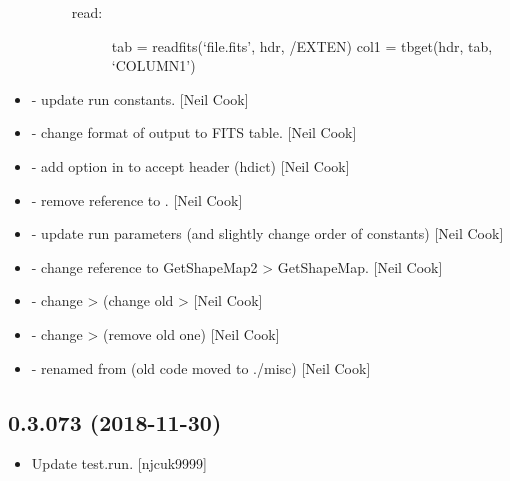 \documentclass[a4paper,10pt,english]{report}
\begin{document}
\begin{itemize}
\begin{description}
\begin{description}
\item[{read:}] \leavevmode
tab = readfits(‘file.fits’, hdr, /EXTEN)
col1 = tbget(hdr, tab, ‘COLUMN1’)

\end{description}

\end{description}

\item {} 
 - update  run constants. {[}Neil Cook{]}

\item {} 
 - change format of output to FITS table. {[}Neil Cook{]}

\item {} 
 - add option in  to accept header (hdict)
{[}Neil Cook{]}

\item {} 
 - remove reference to . {[}Neil
Cook{]}

\item {} 
 - update run parameters (and slightly change order
of constants) {[}Neil Cook{]}

\item {} 
 - change reference to GetShapeMap2 \textendash{}\textgreater{}
GetShapeMap. {[}Neil Cook{]}

\item {} 
 - change  \textendash{}\textgreater{}  (change old
 \textendash{}\textgreater{}  {[}Neil Cook{]}

\item {} 
 - change  \textendash{}\textgreater{} 
(remove old one) {[}Neil Cook{]}

\item {} 
 - renamed from  (old code
moved to ./misc) {[}Neil Cook{]}

\end{itemize}


\subsection{0.3.073 (2018-11-30)}
\label{\detokenize{misc/changelog:id249}}\begin{itemize}
\item {} 
Update test.run. {[}njcuk9999{]}

\end{itemize}
\end{document}
